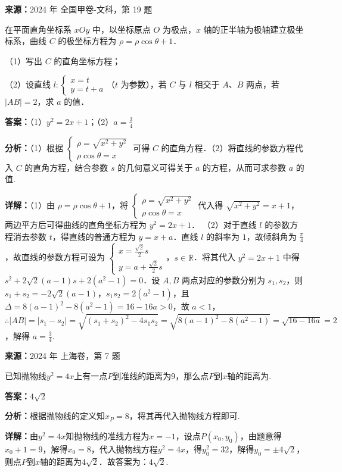 \begin{question}[points=10]
\textbf{来源：}2024 年 全国甲卷-文科，第 19 题\par
在平面直角坐标系 $xOy$ 中，以坐标原点 $O$ 为极点，$x$ 轴的正半轴为极轴建立极坐标系，曲线 $C$ 的极坐标方程为 $\rho = \rho \cos \theta + 1$．

（1）写出 $C$ 的直角坐标方程；

（2）设直线 $l: \begin{cases} x = t \\ y = t + a \end{cases}$（$t$ 为参数），若 $C$ 与 $l$ 相交于 $A$、$B$ 两点，若 $|AB| = 2$，求 $a$ 的值．
\begin{solution}
\textbf{答案：}（1）$y^2 = 2x + 1$；（2）$a = \frac{3}{4}$

\textbf{分析：}（1）根据 $\begin{cases} \rho = \sqrt{x^2 + y^2} \\ \rho \cos \theta = x \end{cases}$ 可得 $C$ 的直角方程．（2）将直线的参数方程代入 $C$ 的直角方程，结合参数 $s$ 的几何意义可得关于 $a$ 的方程，从而可求参数 $a$ 的值.

\textbf{详解：}（1）由 $\rho = \rho \cos \theta + 1$，将 $\begin{cases} \rho = \sqrt{x^2 + y^2} \\ \rho \cos \theta = x \end{cases}$ 代入得 $\sqrt{x^2 + y^2} = x + 1$，两边平方后可得曲线的直角坐标方程为 $y^2 = 2x + 1$．
（2）对于直线 $l$ 的参数方程消去参数 $t$，得直线的普通方程为 $y = x + a$．直线 $l$ 的斜率为 $1$，故倾斜角为 $\frac{\pi}{4}$，故直线的参数方程可设为 $\begin{cases} x = \frac{\sqrt{2}}{2}s \\ y = a + \frac{\sqrt{2}}{2}s \end{cases}$，$s \in \mathbb{R}$．将其代入 $y^2 = 2x + 1$ 中得 $s^2 + 2\sqrt{2}(a-1)s + 2(a^2 - 1) = 0$．设 $A, B$ 两点对应的参数分别为 $s_1, s_2$，则 $s_1 + s_2 = -2\sqrt{2}(a-1)$，$s_1 s_2 = 2(a^2 - 1)$，且 $\Delta = 8(a-1)^2 - 8(a^2 - 1) = 16 - 16a > 0$，故 $a < 1$，$\therefore |AB| = |s_1 - s_2| = \sqrt{(s_1 + s_2)^2 - 4s_1 s_2} = \sqrt{8(a-1)^2 - 8(a^2 - 1)} = \sqrt{16 - 16a} = 2$，解得 $a = \frac{3}{4}$.
\end{solution}
\end{question}

\begin{question}[points=5]
\textbf{来源：}2024 年 上海卷，第 7 题\par
已知抛物线$y^2=4x$上有一点$P$到准线的距离为9，那么点$P$到$x$轴的距离为.
\fillin[{$4\sqrt{2}$}]
\begin{solution}
\textbf{答案：}$4\sqrt{2}$

\textbf{分析：}根据抛物线的定义知$x_P=8$，将其再代入抛物线方程即可.

\textbf{详解：}由$y^2=4x$知抛物线的准线方程为$x=-1$，设点$P(x_0,y_0)$，由题意得$x_0+1=9$，解得$x_0=8$，代入抛物线方程$y^2=4x$，得$y_0^2=32$，解得$y_0=\pm4\sqrt{2}$，则点$P$到$x$轴的距离为$4\sqrt{2}$．故答案为：$4\sqrt{2}$.
\end{solution}
\end{question}


